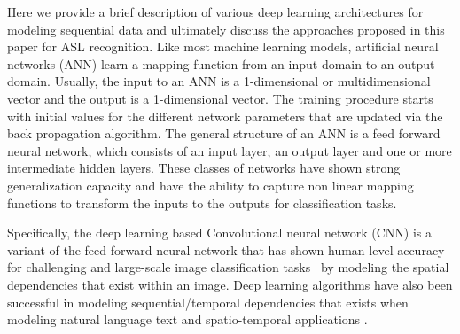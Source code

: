 \documentclass[10pt,twocolumn,letterpaper]{article}
\begin{document}
Here we provide a brief description of various 
deep learning architectures for modeling sequential data and ultimately discuss 
the approaches proposed in this paper for ASL recognition. 
%
Like most  machine learning models,  artificial neural networks (ANN)
learn a mapping function from an input domain to an 
output domain. Usually, the 
input to an ANN is a 1-dimensional 
or multidimensional vector and the 
output is a 1-dimensional 
vector. The training procedure starts 
with initial values for the different 
network parameters that are updated via the 
back propagation algorithm. 
The general structure of an ANN is 
a feed forward neural network, which consists of an input layer, an output layer and one or more intermediate hidden layers.  These classes of 
networks have shown 
strong generalization 
capacity and have the ability to capture 
non linear mapping functions to transform the inputs to the outputs for classification tasks. 


Specifically, the deep learning based 
Convolutional neural network (CNN)  is  a  variant of the 
feed forward neural network that 
has shown human level accuracy for challenging and large-scale 
image classification tasks~\cite{NIPS2012_4824} by modeling the spatial dependencies that exist within an image. Deep 
learning algorithms have also been successful in modeling sequential/temporal 
dependencies that exists when modeling natural language text \cite{DBLP:journals/corr/Graves13,DBLP:journals/corr/SutskeverVL14,DBLP:journals/corr/BahdanauCB14} and spatio-temporal applications \cite{DBLP:journals/corr/abs-0705-2011}. 
\end{document}
